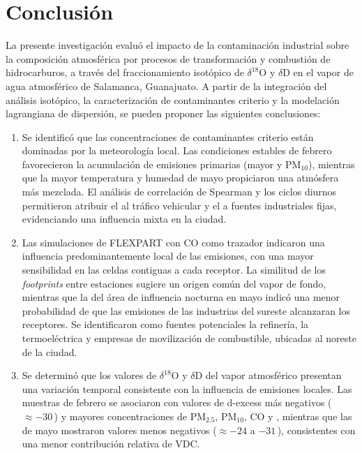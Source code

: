 \chapter{Conclusión}

La presente investigación evaluó el impacto 
de la contaminación industrial sobre la composición 
atmosférica por procesos de transformación y combustión 
de hidrocarburos, a través del fraccionamiento isotópico 
de $\delta^{18}\mathrm{O}$ y $\delta\mathrm{D}$ en el 
vapor de agua atmosférico de Salamanca, Guanajuato. 
A partir de la integración del análisis isotópico, 
la caracterización de contaminantes criterio y la 
modelación lagrangiana de dispersión, se pueden 
proponer las siguientes conclusiones:

\begin{enumerate}
  \item Se identificó que las concentraciones de 
  contaminantes criterio están dominadas por la 
  meteorología local. Las condiciones estables de 
  febrero favorecieron la acumulación de emisiones 
  primarias (mayor  y $\mathrm{PM}_{10}$), 
  mientras que la mayor temperatura y humedad de 
  mayo propiciaron una atmósfera más mezclada. El 
  análisis de correlación de Spearman y los ciclos 
  diurnos permitieron atribuir el  al tráfico 
  vehicular y el  a fuentes industriales fijas, 
  evidenciando una influencia mixta en la ciudad.

  \item Las simulaciones de FLEXPART con CO como 
  trazador indicaron una influencia predominantemente 
  local de las emisiones, con una mayor sensibilidad 
  en las celdas contiguas a cada receptor. La similitud 
  de los \textit{footprints} entre estaciones sugiere 
  un origen común del vapor de fondo, mientras que la 
   del área de influencia nocturna en mayo indicó una 
   menor probabilidad de que las emisiones de las 
   industrias del sureste alcanzaran los receptores. 
   Se identificaron como fuentes potenciales la refinería, 
   la termoeléctrica y empresas de movilización de 
   combustible, ubicadas al noreste de la ciudad.

  \item Se determinó que los valores de $\delta^{18}\mathrm{O}$ 
  y $\delta\mathrm{D}$ del vapor atmosférico presentan una 
  variación temporal consistente con la influencia de emisiones 
  locales. Las muestras de febrero se asociaron con valores de
  d-excess más negativos ($\approx -30$\,\textperthousand) y 
  mayores concentraciones de $\mathrm{PM}_{2.5}$, $\mathrm{PM}_{10}$, 
  CO y , mientras que las de mayo mostraron valores menos 
  negativos ($\approx -24$ a $-31$\,\textperthousand), consistentes 
  con una menor contribución relativa de VDC.


\end{enumerate}
